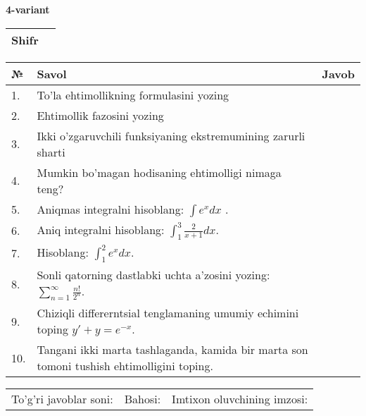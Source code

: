 \documentclass{article}
\begin{document}
  \egroup
  
  \newpage
  
  
  \textbf{4-variant}\\
  
  \bgroup
  \def\arraystretch{1.6} %
  
  \begin{tabular}{|m{5.7cm}|m{9.5cm}|}
  \hline
  Shifr & \\
  \hline
  \end{tabular}
  
  \vspace{1cm}
  
  \begin{tabular}{|m{0.7cm}|m{10cm}|m{4cm}|}
  \hline
  № & Savol & Javob \\
  \hline
  1. & To'la ehtimollikning formulasini yozing &  \\
  \hline
  2. & Ehtimollik fazosini yozing &  \\
  \hline
  3. & Ikki o'zgaruvchili funksiyaning ekstremumining zarurli sharti &  \\
  \hline
  4. & Mumkin bo'magan hodisaning ehtimolligi nimaga teng? &  \\
  \hline
  5. & Aniqmas integralni hisoblang: \(\int {e^{x}dx}\) . &  \\
  \hline
  6. & Aniq integralni hisoblang: \(\int_{1}^{3}\frac{2}{x + 1}dx\). &  \\
  \hline
  7. & Hisoblang: \(\int_{1}^{2}{e^{x}dx}\). &  \\
  \hline
  8. & Sonli qatorning dastlabki uchta a'zosini yozing: \(\sum_{n = 1}^{\infty}\frac{n!}{2^{n}}\). &  \\
  \hline
  9. & Chiziqli differerntsial tenglamaning umumiy echimini toping \(y' + y = e^{- x}\). &  \\
  \hline
  10. & Tangani ikki marta tashlaganda, kamida bir marta son tomoni tushish ehtimolligini toping. &  \\
  \hline
  \end{tabular}
  
  \vspace{1cm}
  
  \begin{tabular}{lll}
  To'g'ri javoblar soni: \underline{\hspace{1.5cm}} & 
  Bahosi: \underline{\hspace{1.5cm}} & 
  Imtixon oluvchining imzosi: \underline{\hspace{2cm}} \\
  \end{tabular}
  
\end{document}
